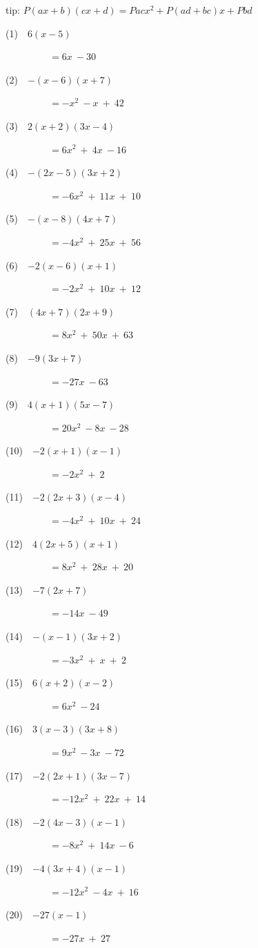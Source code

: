 \documentclass[a4j,twocolumn,10pt,fleqn]{jarticle}
\begin{document}
tip: $P(ax + b)(cx + d) = Pacx^2 + P(ad + bc)x + Pbd$

(1)~~$6(x-5)$

~~~~~~~~~$=6x~-30$

(2)~~$-(x-6)(x+7)$

~~~~~~~~~$=-x^2~-x~+~42$

(3)~~$2(x+2)(3x-4)$

~~~~~~~~~$=6x^2~+~4x~-16$

(4)~~$-(2x-5)(3x+2)$

~~~~~~~~~$=-6x^2~+~11x~+~10$

(5)~~$-(x-8)(4x+7)$

~~~~~~~~~$=-4x^2~+~25x~+~56$

(6)~~$-2(x-6)(x+1)$

~~~~~~~~~$=-2x^2~+~10x~+~12$

(7)~~$(4x+7)(2x+9)$

~~~~~~~~~$=8x^2~+~50x~+~63$

(8)~~$-9(3x+7)$

~~~~~~~~~$=-27x~-63$

(9)~~$4(x+1)(5x-7)$

~~~~~~~~~$=20x^2~-8x~-28$

(10)~~$-2(x+1)(x-1)$

~~~~~~~~~$=-2x^2~+~2$

(11)~~$-2(2x+3)(x-4)$

~~~~~~~~~$=-4x^2~+~10x~+~24$

(12)~~$4(2x+5)(x+1)$

~~~~~~~~~$=8x^2~+~28x~+~20$

(13)~~$-7(2x+7)$

~~~~~~~~~$=-14x~-49$

(14)~~$-(x-1)(3x+2)$

~~~~~~~~~$=-3x^2~+~x~+~2$

(15)~~$6(x+2)(x-2)$

~~~~~~~~~$=6x^2~-24$

(16)~~$3(x-3)(3x+8)$

~~~~~~~~~$=9x^2~-3x~-72$

(17)~~$-2(2x+1)(3x-7)$

~~~~~~~~~$=-12x^2~+~22x~+~14$

(18)~~$-2(4x-3)(x-1)$

~~~~~~~~~$=-8x^2~+~14x~-6$

(19)~~$-4(3x+4)(x-1)$

~~~~~~~~~$=-12x^2~-4x~+~16$

(20)~~$-27(x-1)$

~~~~~~~~~$=-27x~+~27$
\end{document}
